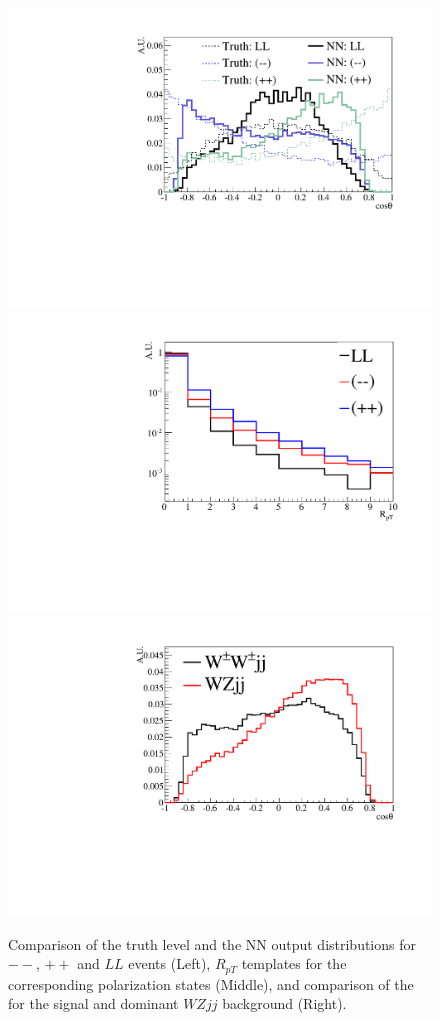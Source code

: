 \begin{figure}
\includegraphics[width=.32\textwidth]{./fig/1d_templates_graph_X.pdf}
\includegraphics[width=.32\textwidth]{./fig/ratios_LLRROO_graph.pdf}
\includegraphics[width=.32\textwidth]{./fig/1d_wz_bg_graph_X.pdf}
\caption{\label{fig:polarization_comparison} Comparison of the truth level \cts and the 
NN output \ctsNN distributions for $--$, $++$ and $LL$ events (Left), 
$R_{pT}$ templates for the corresponding polarization states (Middle), 
and comparison of the \ctsNN for the signal and dominant $WZjj$ background (Right).}
\end{figure}

